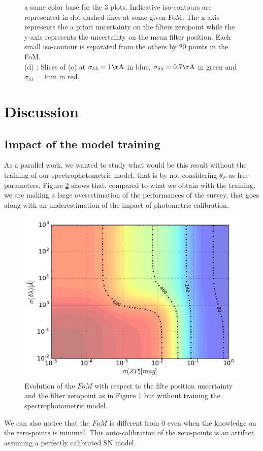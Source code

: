 \documentclass[\docopts]{\docclass}
\begin{document}
\begin{figure}[t]
\begin{center}
{  a same color base for the 3 plots. Indicative iso-contours are
  represented in dot-dashed lines at some given FoM. The x-axis
  represents the a priori uncertainty on the filters zeropoint while
  the y-axis represents the uncertainty on the mean filter
  position. Each small iso-contour is separated from the others by 20
  points in the FoM. \\ (d) : Slices of (c) at
  $\sigma_{\delta\lambda} = 1\mathrm{\AA}$ in
  blue, $\sigma_{\delta\lambda} = 0.7\mathrm{\AA}$ in green and
  $\sigma_{\delta\lambda} = 1\mathrm{nm}$ in red.}
\label{fig:fom_grids}
\end{center}
\end{figure}



\section{Discussion}
\label{sec::discussion}
\subsection{Impact of the model training}
\label{ssec::training}
As a parallel work, we wanted to study what would be this result without the training of our spectrophotometric model, that is by not considering $\theta_P$ as free parameters.
Figure \ref{fig:fom_wout_training} shows that, compared to what we obtain with the training, we are making a large overestimation of the performances of the survey, that goes along with an underestimation of the impact of photometric calibration.
\begin{figure}[ht]
  \centering
  \includegraphics[width=\linewidth]{FoM-grid_10-seasons_AltSched_no-training.pdf}
  \caption{Evolution of the $FoM$ with respect to the filte position
    uncertainty and the filter zeropoint as in Figure
    \ref{fig:fom_grids} but without training the spectrophotometric
    model.}
  \label{fig:fom_wout_training}
\end{figure}
We can also notice that the $FoM$ is different from 0 even when the knowledge on the zero-points is minimal.
This auto-calibration of the zero-points is an artifact assuming a perfectly calibrated SN model.
\end{document}
